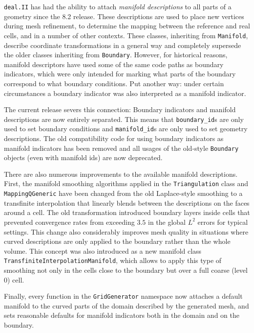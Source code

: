 \documentclass{ansarticle-preprint}
\newcommand{\specialword}[1]{\texttt{#1}}
\newcommand{\dealii}{{\specialword{deal.II}}\xspace}
\begin{document}

\dealii{} has had the ability to attach \textit{manifold descriptions} to all
parts of a geometry since the 8.2 release. These descriptions are used to place
new vertices during mesh refinement, to determine the mapping between the
reference and real cells, and in a number of other contexts. These classes,
inheriting from \texttt{Manifold}, describe coordinate transformations in a
general way and completely supersede the older classes inheriting from
\texttt{Boundary}. However, for historical reasons, manifold descriptors have
used some of the same code paths as boundary indicators, which were only
intended for marking what parts of the boundary correspond to what boundary
conditions. Put another way: under certain circumstances a boundary indicator
was also interpreted as a manifold indicator.

The current release severs this connection: Boundary indicators and manifold
descriptions are now entirely separated. This means that \texttt{boundary\_id}s
are only used to set boundary conditions and \texttt{manifold\_id}s are only
used to set geometry descriptions. The old compatibility code for using boundary
indicators as manifold indicators has been removed and all usages of the
old-style \texttt{Boundary} objects (even with manifold ids) are now deprecated.

There are also numerous improvements to the available manifold descriptions.
First, the manifold smoothing algorithms applied in the \texttt{Triangulation}
class and \texttt{MappingQGeneric} have been changed from the old Laplace-style
smoothing to a transfinite interpolation that linearly blends between the
descriptions on the faces around a cell. The old transformation introduced
boundary layers inside cells that prevented convergence rates from exceeding
\(3.5\) in the global \(L^2\) errors for typical settings. This change also
considerably improves mesh quality in situations where curved descriptions are
only applied to the boundary rather than the whole volume. This concept was also
introduced as a new manifold class \texttt{TransfiniteInterpolationManifold},
which allows to apply this type of smoothing not only in the cells close to the
boundary but over a full coarse (level 0) cell.

Finally, every function in the \texttt{GridGenerator} namespace now attaches a
default manifold to the curved parts of the domain described by the generated
mesh, and sets reasonable defaults for manifold indicators both in the domain
and on the boundary.
\end{document}
